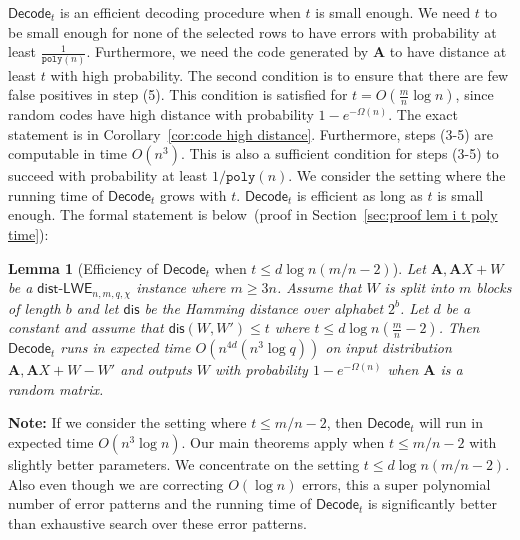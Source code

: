 \documentclass[11pt]{article}
\newcommand{\secref}[1]{\mbox{Section~\ref{#1}}}
\newcommand{\corref}[1]{\mbox{Corollary~\ref{#1}}}
\newcommand{\lemref}[1]{\mbox{Lemma~\ref{#1}}}
\newcommand{\class}[1]{{\ensuremath{\mathsf{#1}}}}
\newcommand{\vect}[1]{\ensuremath{\textbf{#1}}}
\newcommand{\dis}{\ensuremath{\mathsf{dis}}}
\newcommand{\decode}{\ensuremath{\mathsf{Decode}}}
\newcommand{\poly}{\ensuremath{\mathtt{poly}}\xspace}
\newcommand{\distLWE}{\ensuremath{\class{dist\mbox{-}LWE}}}
\newtheorem{lemma}[theorem]{Lemma}
\newcommand{\authnote}[2]{{\textcolor{red}{\textsf{#1 notes: }\textcolor{blue}{ #2}}\marginpar{\textcolor{red}{\textbf{!!!!!}}}}}
\newcommand{\authnote}[2]{}
\newcommand{\lnote}[1]{{\authnote{Leo}{#1}}}
\newcommand{\vA}{\vect{A}}
\begin{document}
$\decode_t$ is an efficient decoding procedure when $t$ is small enough.  We need $t$ to be small enough for none of the selected rows to have errors with probability at least $\frac{1}{\poly(n)}$. Furthermore, we need the code generated by $\vA$ to have distance at least $t$ with high probability.  The second condition is to ensure that there are few false positives in step (5).  This condition is satisfied for $t = O(\frac{m}{n}\log n)$, since random codes have high distance with probability $1-e^{-\Omega(n)}$.  The exact statement is in \corref{cor:code high distance}.  Furthermore, steps (3-5) are computable in time $O(n^3)$.
This is also a sufficient condition for steps (3-5) to succeed with probability at least $1/\poly(n)$.  We consider the setting where the running time of $\decode_t$ grows with $t$.  $\decode_t$ is efficient as long as $t$ is small enough.  The formal statement is below~(proof in \secref{sec:proof lem i t poly time}):
\begin{lemma}[Efficiency of $\decode_t$ when $t\leq d\log n (m/n-2)$]
\label{lem:i t poly time}
Let $\vA, \vA X+W$ be a  $\distLWE_{n,m, q, \chi}$ instance where $m\geq 3n$.  Assume that $W$ is split into $m$ blocks of length $b$ and let $\dis$ be the Hamming distance over alphabet $2^b$.  Let $d$ be a constant and assume that $\dis(W, W')\leq t$ where $t\leq d\log n(\frac{m}{n}-2)$.  Then $\decode_t$ runs in expected time $O(n^{4d}(n^3\log q))$ on input distribution $\vA, \vA X+W - W'$ and outputs $W$ with probability $1-e^{-\Omega(n)}$ when $\vA$ is a random matrix.
\end{lemma}
\textbf{Note:} If we consider the setting where $t\leq m/n-2$, then $\decode_t$ will run in expected time $O(n^3\log n)$.  Our main theorems apply when $t\leq m/n-2$ with slightly better parameters.  We concentrate on the setting $t\leq d\log n(m/n-2)$.  Also even though we are correcting $O(\log n)$ errors, this a super polynomial number of error patterns and the running time of $\decode_t$ is significantly better than exhaustive search over these error patterns.
\end{document}
